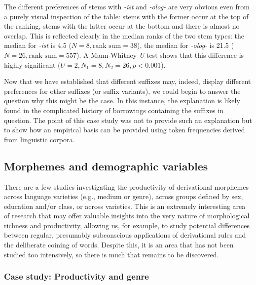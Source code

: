 The different preferences of stems  with \textit{-ist} and \textit{-olog-} are very obvious even from a purely visual inspection of the table: stems with the former  occur at the top of the ranking, stems with the latter occur at the bottom and there is almost no overlap. This is reflected clearly in the median  ranks of the two stem types:  the median for \textit{-ist} is 4.5 ($N = 8, \text{rank sum} = 38$), the median for \textit{-olog-} is 21.5 ($N = 26, \text{rank sum} = 557$). A Mann\hyp{}Whitney  \textit{U} test shows that this difference is highly significant ($U = 2, N_1 = 8, N_2 = 26, p < 0.001$).

Now that we have established that different suffixes  may, indeed, display different preferences for other suffixes  (or suffix variants), we could begin to answer the question why this might be the case. In this instance, the explanation is likely found in the complicated history of borrowings containing the suffixes  in question.  The point of this case study was not to provide such an explanation but to show how an empirical basis can be provided using token  frequencies  derived from linguistic corpora.

\subsection{Morphemes and demographic variables}
\label{sec:morphemesanddemographicvariables}

There are a few studies investigating the productivity  of derivational morphemes  across language varieties  (e.g., medium  or genre),  across groups defined by sex, education and\slash or class, or across varieties. This is an extremely interesting area of research that may offer valuable insights into the very nature of morphological richness and productivity,  allowing us, for example, to study potential differences between regular, presumably subconscious applications of derivational rules and the deliberate coining of words. Despite this, it is an area that has not been studied too intensively, so there is much that remains to be discovered.

\subsubsection{Case study: Productivity and genre}
\label{sec:productivityandgenre}

